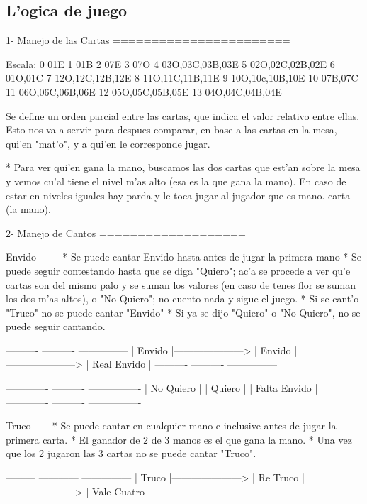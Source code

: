 \subsection{L'ogica de juego}

1- Manejo de las Cartas
=======================

Escala:
0 01E
1 01B
2 07E
3 07O
4 03O,03C,03B,03E
5 02O,02C,02B,02E
6 01O,01C
7 12O,12C,12B,12E
8 11O,11C,11B,11E
9 10O,10c,10B,10E
10  07B,07C
11  06O,06C,06B,06E
12  05O,05C,05B,05E
13  04O,04C,04B,04E

  Se define un orden parcial entre las cartas, que indica el valor relativo entre ellas. Esto nos va a servir para despues comparar, en base a las cartas en la mesa, qui'en "mat'o", y a qui'en le corresponde jugar.

  * Para ver qui'en gana la mano, buscamos las dos cartas que est'an sobre la mesa y vemos cu'al tiene el nivel m'as alto (esa es la que gana la mano). En caso de estar en niveles iguales hay parda y le toca jugar al jugador que es mano.
carta (la mano).


2- Manejo de Cantos
===================

Envido
------
  * Se puede cantar Envido hasta antes de jugar la primera mano
  * Se puede seguir contestando hasta que se diga "Quiero"; ac'a se procede a ver qu'e cartas son del mismo palo y se suman los valores (en caso de tenes flor se suman los dos m'as altos), o "No Quiero"; no cuento nada y sigue el juego.
  * Si se cant'o "Truco" no se puede cantar "Envido"
  * Si ya se dijo "Quiero" o "No Quiero", no se puede seguir cantando.

      ----------                       ----------                       ---------------
      | Envido |---------------------> | Envido |---------------------> | Real Envido |
      ----------                       ----------                       ---------------




      -------------          ----------     ----------------
      | No Quiero |          | Quiero |     | Falta Envido |
      -------------          ----------     ----------------

Truco
-----
  * Se puede cantar en cualquier mano e inclusive antes de jugar la primera carta.
  * El ganador de 2 de 3 manos es el que gana la mano.
  * Una vez que los 2 jugaron las 3 cartas no se puede cantar "Truco".

      ---------                       ------------                       ---------------
      | Truco |---------------------> | Re Truco |---------------------> | Vale Cuatro |
      ---------                       ------------                       ---------------



